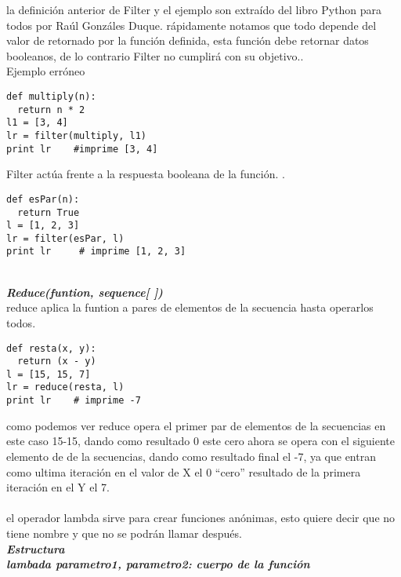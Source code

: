 \begin{multicols}{2}
la definición anterior de Filter y el ejemplo son extraído del libro \cite{kopka}Python para todos por Raúl Gonzáles Duque.  
rápidamente notamos que todo depende del valor de retornado por la función definida, esta  función debe retornar datos booleanos,
de lo contrario Filter no cumplirá con su objetivo..\\

Ejemplo erróneo\\
\lstset{language=Python,frame=tb,framesep=5pt,basicstyle=\footnotesize}   
\begin{lstlisting}
def multiply(n):
  return n * 2
l1 = [3, 4]
lr = filter(multiply, l1)                  
print lr	#imprime [3, 4]
\end{lstlisting}
Filter actúa  frente a la respuesta booleana de la función. .\\
\lstset{language=Python,frame=tb,framesep=5pt,basicstyle=\footnotesize}   
\begin{lstlisting}
def esPar(n):
  return True
l = [1, 2, 3]
lr = filter(esPar, l)
print lr	 # imprime [1, 2, 3]
\end{lstlisting}
\\ %
\textit{\textbf{Reduce(funtion, sequence[ ])}}\\
reduce aplica la funtion a pares de elementos de la secuencia hasta operarlos todos.\\

\lstset{language=Python,frame=tb,framesep=5pt,basicstyle=\footnotesize}   
\begin{lstlisting}
def resta(x, y):
  return (x - y)
l = [15, 15, 7]
lr = reduce(resta, l)
print lr 	# imprime -7
\end{lstlisting}

como podemos ver reduce opera el primer par de elementos de la secuencias en este caso 15-15,
dando como resultado 0 este cero ahora se opera con el siguiente elemento de de la secuencias, 
dando como resultado final el -7, ya que entran como ultima iteración en el valor de X el 0 ``cero''
resultado de la primera iteración en el Y el 7.\\

\\ %
el operador lambda sirve para crear funciones anónimas, esto quiere decir que no tiene nombre y que no se podrán llamar después.\\
\textit{
\textbf{Estructura}\\
\textbf{lambada parametro1, parametro2: cuerpo de la función}}\\


\end{multicols}
